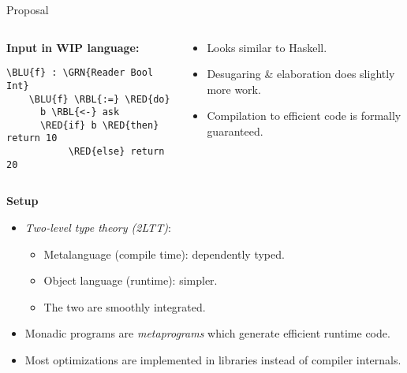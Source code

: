 \documentclass[dvipsnames,aspectratio=169]{beamer}
\theoremstyle{remark}
\newcommand{\RED}[1]{{\color{BrickRed} #1}}
\newcommand{\GRN}[1]{{\color{OliveGreen} #1}}
\newcommand{\RBL}[1]{{\color{RoyalBlue} #1}}
\newcommand{\BLU}[1]{{\color{Blue} #1}}
\begin{document}
\begin{frame}[fragile]{Proposal}

\begin{columns}
\begin{column}{0.3\textwidth}
\textbf{Input in WIP language:}
\begin{Verbatim}[commandchars=\\\{\}]
    \BLU{f} : \GRN{Reader Bool Int}
    \BLU{f} \RBL{:=} \RED{do}
      b \RBL{<-} ask
      \RED{if} b \RED{then} return 10
           \RED{else} return 20
\end{Verbatim}

\end{column}
\begin{column}{0.6\textwidth}
\begin{itemize}
\item Looks similar to Haskell.
\item Desugaring \& elaboration does slightly more work.
\item Compilation to efficient code is formally guaranteed.
\end{itemize}
\end{column}
\end{columns}
\vspace{1em}
\pause

\begin{block}{}
\textbf{Setup}
\begin{itemize}
\item \emph{Two-level type theory (2LTT)}:
  \begin{itemize}
    \item Metalanguage (compile time): dependently typed.
    \item Object language (runtime): simpler.
    \item The two are smoothly integrated.
  \end{itemize}
\item Monadic programs are \emph{metaprograms} which generate efficient
  runtime code.
\item Most optimizations are implemented in libraries instead of compiler internals.
\end{itemize}
\end{block}

\end{frame}
\end{document}
